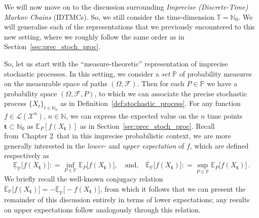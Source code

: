 \documentclass[graybox]{svmult}
\newcommand{\nats}{\mathbb{N}}
\newcommand{\natswith}{\nats_{0}}
\newcommand{\states}{\mathcal{X}}
\newcommand{\gambles}{\mathcal{L}}
\newcommand{\coloneqq}{:\!=}
\newcommand{\timedim}{\mathbb{T}}
\def\refIPChapter{Chapter 2}
\begin{document}

We will now move on to the discussion surrounding \emph{Imprecise (Discrete-Time) Markov Chains} (IDTMCs). So, we still consider the time-dimension $\timedim=\natswith$. We will generalise each of the representations that we previously encountered to this new setting, where we roughly follow the same order as in Section~\ref{sec:prec_stoch_proc}. 

So, let us start with the ``measure-theoretic'' representation of imprecise stochastic processes. In this setting, we consider a \emph{set} $\mathbb{P}$ of probability measures on the measurable space of paths $(\Omega,\mathcal{F})$. Then for each $P\in\mathbb{P}$ we have a probability space $(\Omega,\mathcal{F},P)$, to which we can associate the precise stochastic process $\{X_t\}_{t\in\natswith}$ as in Definition~\ref{def:stochastic_process}. For any function $f\in\gambles(\states^n)$, $n\in\nats$, we can express the expected value on the $n$ time points $\mathbf{t}\subset\natswith$ as $\mathbb{E}_P[f(X_\mathbf{t})]$ as in Section~\ref{sec:prec_stoch_proc}. Recall from~\refIPChapter~that in this imprecise probabilistic context, we are more generally interested in the \emph{lower-} and \emph{upper expectation} of $f$, which are defined respectively as
\begin{equation*}
\underline{\mathbb{E}}_\mathbb{P}\bigl[f(X_\mathbf{t})\bigr] \coloneqq \inf_{P\in\mathbb{P}} \mathbb{E}_P\bigl[f(X_\mathbf{t})\bigr],\quad\text{and,}\quad \overline{\mathbb{E}}_\mathbb{P}\bigl[f(X_\mathbf{t})\bigr] \coloneqq \sup_{P\in\mathbb{P}} \mathbb{E}_P\bigl[f(X_\mathbf{t})\bigr]\,.
\end{equation*}
We briefly recall the well-known conjugacy relation $\overline{\mathbb{E}}_\mathbb{P}\bigl[f(X_\mathbf{t})\bigr]=-\underline{\mathbb{E}}_\mathbb{P}\bigl[-f(X_\mathbf{t})\bigr]$, from which it follows that we can present the remainder of this discussion entirely in terms of lower expectations; any results on upper expectations follow analogously through this relation.
\end{document}
